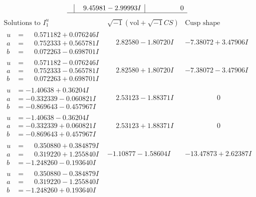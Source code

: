 \documentclass[1p]{elsarticle_modified}
\theoremstyle{definition}
\newcommand{\I}{\sqrt{-1}}
\begin{document}
$$\begin{array}{c|c|c}
 & \phantom{-}9.45981 - 2.99993 I & \phantom{-0.000000 } 0\\
 \hline 
 \end{array}$$\newpage$$\begin{array}{c|c|c}  
\text{Solutions to }I^u_{1}& \I (\text{vol} + \sqrt{-1}CS) & \text{Cusp shape}\\
 \hline 
\begin{aligned}
u &= \phantom{-}0.571182 + 0.076246 I \\
a &= \phantom{-}0.752333 + 0.565781 I \\
b &= \phantom{-}0.072263 - 0.698701 I\end{aligned}
 & \phantom{-}2.82580 - 1.80720 I & -7.38072 + 3.47906 I \\ \hline\begin{aligned}
u &= \phantom{-}0.571182 - 0.076246 I \\
a &= \phantom{-}0.752333 - 0.565781 I \\
b &= \phantom{-}0.072263 + 0.698701 I\end{aligned}
 & \phantom{-}2.82580 + 1.80720 I & -7.38072 - 3.47906 I \\ \hline\begin{aligned}
u &= -1.40638 + 0.36204 I \\
a &= -0.332339 - 0.060821 I \\
b &= -0.869643 - 0.457967 I\end{aligned}
 & \phantom{-}2.53123 - 1.88371 I & \phantom{-0.000000 } 0 \\ \hline\begin{aligned}
u &= -1.40638 - 0.36204 I \\
a &= -0.332339 + 0.060821 I \\
b &= -0.869643 + 0.457967 I\end{aligned}
 & \phantom{-}2.53123 + 1.88371 I & \phantom{-0.000000 } 0 \\ \hline\begin{aligned}
u &= \phantom{-}0.350880 + 0.384879 I \\
a &= \phantom{-}0.319220 + 1.255840 I \\
b &= -1.248260 - 0.193640 I\end{aligned}
 & -1.10877 - 1.58604 I & -13.47873 + 2.62387 I \\ \hline\begin{aligned}
u &= \phantom{-}0.350880 - 0.384879 I \\
a &= \phantom{-}0.319220 - 1.255840 I \\
b &= -1.248260 + 0.193640 I\end{aligned}

\end{array}$$
\end{document}
